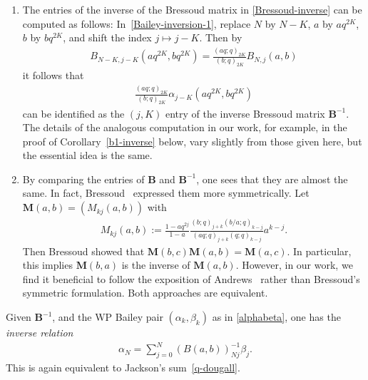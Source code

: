 \documentclass[pdftex]{sigma}
\numberwithin{equation}{section}
\newtheorem*{remarks*}{Remarks}
\newenvironment{Remarks*}{\begin{remarks*}\normalfont}{\end{remarks*}}
\newcommand{\B}{{ \mathbf B}}
\newcommand{\M}{{ \mathbf M}}
\newcommand{\qrfac}[2]{{\left({#1}; q\right)_{#2}}} %
\begin{document}
\begin{Remarks*}\quad
\begin{enumerate}\itemsep=0pt
\item The entries of the inverse of the Bressoud matrix in \eqref{Bressoud-inverse} can be computed as follows:
In~\eqref{Bailey-inversion-1}, replace $N$ by $N-K$, $a$ by $aq^{2K}$, $b$ by $bq^{2K}$, and shift the index $j\mapsto j-K$. Then by
\begin{gather*}
B_{N-K,j-K}\left(aq^{2K},bq^{2K}\right)=\frac{(aq;q)_{2K}}{(b;q)_{2K}}B_{N,j}(a,b)
\end{gather*}
it follows that
\begin{gather*}
\frac{(aq;q)_{2K}}{(b;q)_{2K}}\alpha_{j-K}\left(aq^{2K},bq^{2K}\right)
\end{gather*}
can be identified as the $(j,K)$ entry of the inverse Bressoud matrix $\B^{-1}$. The details of the analogous computation in our work, for example, in the proof of Corollary~\ref{b1-inverse} below, vary slightly from those given here, but the essential idea is the same.
\item By comparing the entries of $\B$ and $\B^{-1}$, one sees that they are almost the same. In fact, Bressoud~\cite{DB1983} expressed them more symmetrically. Let $\M(a,b)=(M_{kj}(a,b))$ with
\begin{gather*}\label{Bressoud-original}
M_{k j}(a,b) := \frac{1-aq^{2j}}{1-a} \frac{\qrfac{b}{j+k} \qrfac{b/a}{k-j}}
{ \qrfac{aq}{j+k}\qrfac{q}{k-j}} a^{k-j}.
\end{gather*}
Then Bressoud showed that $\M(b,c)\M(a,b)=\M(a,c)$. In particular, this implies $\M(b,a)$ is the inverse of $\M(a,b)$. However, in our work, we find it beneficial to follow the exposition of Andrews~\cite{Andrews2001} rather than Bressoud's symmetric formulation. Both approaches are equivalent.
\end{enumerate}
\end{Remarks*}

Given $\B^{-1}$, and the WP Bailey pair $(\alpha_k,\beta_k)$ as in \eqref{alphabeta}, one has the {\it inverse relation}
\begin{gather*}%
\alpha_N = \sum_{j=0}^N (B(a,b))^{-1}_{Nj} \beta_j.
\end{gather*}
This is again equivalent to Jackson's sum~\eqref{q-dougall}.
\end{document}
